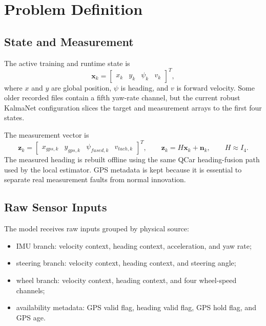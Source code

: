 \documentclass[11pt,a4paper]{article}
\newcommand{\state}{\bm{x}}
\newcommand{\meas}{\bm{z}}
\begin{document}
\section{Problem Definition}

\subsection{State and Measurement}

The active training and runtime state is
\begin{equation}
  \state_k =
  \begin{bmatrix}
    x_k & y_k & \psi_k & v_k
  \end{bmatrix}^{T},
\end{equation}
where $x$ and $y$ are global position, $\psi$ is heading, and $v$ is forward
velocity. Some older recorded files contain a fifth yaw-rate channel, but the
current robust KalmaNet configuration slices the target and measurement arrays
to the first four states.

The measurement vector is
\begin{equation}
  \meas_k =
  \begin{bmatrix}
    x_{gps,k} & y_{gps,k} & \psi_{fused,k} & v_{tach,k}
  \end{bmatrix}^{T},
  \qquad
  \meas_k = H\state_k + \bm{n}_k,
  \qquad
  H \approx I_4 .
\end{equation}
The measured heading is rebuilt offline using the same QCar heading-fusion path
used by the local estimator. GPS metadata is kept because it is essential to
separate real measurement faults from normal innovation.

\subsection{Raw Sensor Inputs}

The model receives raw inputs grouped by physical source:
\begin{itemize}
  \item IMU branch: velocity context, heading context, acceleration, and yaw
  rate;
  \item steering branch: velocity context, heading context, and steering angle;
  \item wheel branch: velocity context, heading context, and four wheel-speed
  channels;
  \item availability metadata: GPS valid flag, heading valid flag, GPS hold
  flag, and GPS age.
\end{itemize}
\end{document}
